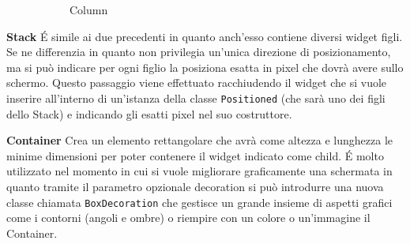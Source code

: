 \begin{trivlist}
\begin{figure}[h!]
\begin{subfigure}{0.3\linewidth}
				\caption{Column}
			\end{subfigure}
			\caption{}
			\label{rowColumn}
		\end{figure} 
		\item \textbf{Stack} \newline
		\'E simile ai due precedenti in quanto anch'esso contiene diversi widget
		figli. Se ne differenzia in quanto non privilegia un'unica direzione di
		posizionamento, ma si può indicare per ogni figlio la posiziona esatta
		in pixel che dovrà avere sullo schermo. Questo passaggio viene
		effettuato racchiudendo il widget che si vuole inserire all'interno di
		un'istanza della classe \verb|Positioned| (che sarà uno dei figli dello Stack)
		e indicando gli esatti pixel nel suo costruttore. 
		\item \textbf{Container} \newline
		Crea un elemento rettangolare che avrà come altezza e lunghezza le
		minime dimensioni per poter contenere il widget indicato come child. \'E
		molto utilizzato nel momento in cui si vuole migliorare graficamente una
		schermata in quanto tramite il parametro opzionale decoration si può
		introdurre una nuova classe chiamata \texttt{BoxDecoration} che gestisce un
		grande insieme di aspetti grafici come i contorni (angoli e
		ombre) o riempire con un colore o un'immagine il Container.
	\end{trivlist}

